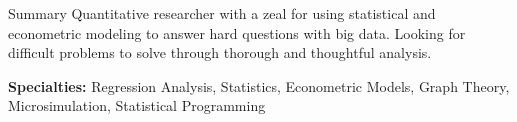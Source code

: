 \documentclass{resume} %
\begin{document}

\begin{rSection}{Summary}
Quantitative researcher with a zeal for using statistical and econometric modeling to answer hard questions with big data. Looking for difficult problems to solve through thorough and thoughtful analysis.

{\bf Specialties:} Regression Analysis, Statistics, Econometric Models, Graph Theory, \\ Microsimulation, Statistical Programming
\end{rSection}


\end{document}
